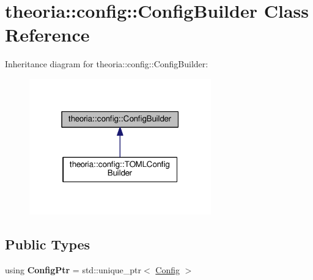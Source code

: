 \hypertarget{classtheoria_1_1config_1_1ConfigBuilder}{}\section{theoria\+:\+:config\+:\+:Config\+Builder Class Reference}
\label{classtheoria_1_1config_1_1ConfigBuilder}


Inheritance diagram for theoria\+:\+:config\+:\+:Config\+Builder\+:
\nopagebreak
\begin{figure}[H]
\begin{center}
\leavevmode
\includegraphics[width=223pt]{classtheoria_1_1config_1_1ConfigBuilder__inherit__graph}
\end{center}
\end{figure}
\subsection*{Public Types}
\begin{DoxyCompactItemize}
\item 
\mbox{\label{classtheoria_1_1config_1_1ConfigBuilder_a31d4cfc983e8ad468c483822731d790f}} 
using {\bfseries Config\+Ptr} = std\+::unique\+\_\+ptr$<$ \hyperlink{classtheoria_1_1config_1_1Config}{Config} $>$
\end{DoxyCompactItemize}
